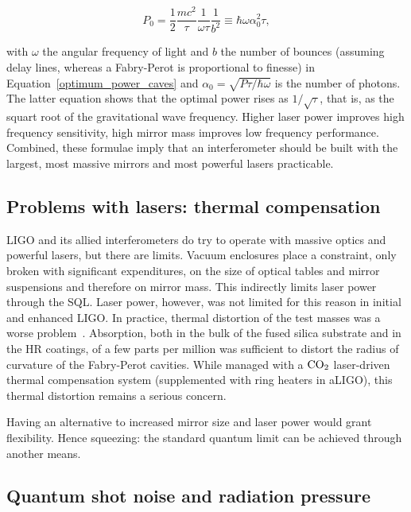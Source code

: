 \begin{equation}
P_0 = \frac{1}{2} \frac{mc^2}{\tau}\frac{1}{\omega \tau} \frac{1}{b^2} \equiv {\hbar \omega \alpha_0^2}{\tau},
\label{optimum_power_caves}
\end{equation}

\noindent with $\omega$ the angular frequency of light and $b$ the number of bounces (assuming delay lines, whereas a Fabry-Perot is proportional to finesse) in Equation~\ref{optimum_power_caves} and $\alpha_0 = \sqrt{P \tau / \hbar \omega}$ is the number of photons.
The latter equation shows that the optimal power rises as $1/\sqrt{\tau}$, that is, as the squart root of the gravitational wave frequency.
Higher laser power improves high frequency sensitivity, high mirror mass improves low frequency performance.
Combined, these formulae imply that an interferometer should be built with the largest, most massive mirrors and most powerful lasers practicable.

        \subsection{Problems with lasers: thermal compensation}
        \label{TCS}


LIGO and its allied interferometers do try to operate with massive optics and powerful lasers, but there are limits.
Vacuum enclosures place a constraint, only broken with significant expenditures, on the size of optical tables and mirror suspensions and therefore on mirror mass.
This indirectly limits laser power through the SQL.
Laser power, however, was not limited for this reason in initial and enhanced LIGO.
In practice, thermal distortion of the test masses was a worse problem~\cite{BallmerThesis}.
Absorption, both in the bulk of the fused silica substrate and in the HR coatings, of a few parts per million was sufficient to distort the radius of curvature of the Fabry-Perot cavities.
While managed with a $\textup{CO}_2$ laser-driven thermal compensation system (supplemented with ring heaters in aLIGO), this thermal distortion remains a serious concern.

Having an alternative to increased mirror size and laser power would grant flexibility.
Hence squeezing: the standard quantum limit can be achieved through another means.


        \subsection{Quantum shot noise and radiation pressure}
        \label{quantum_noise}

